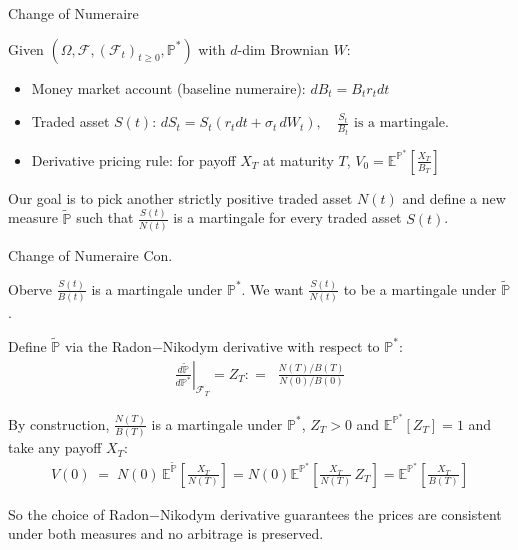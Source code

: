 \documentclass{beamer}
\begin{document}
\begin{frame}{Change of Numeraire}
    \par Given $(\Omega, \mathcal{F}, (\mathcal{F}_t)_{t \geq 0}, \mathbb{P}^*)$ with $d$-dim Brownian $W$:
    \vspace{1em}
    \begin{itemize}
        \item Money market account (baseline numeraire): $ dB_t =  B_t r_t dt$
        \item Traded asset $S(t)$: $dS_t = S_t(r_t dt + \sigma_t\, dW_t),
    \quad \tfrac{S_t}{B_t} \text{ is a martingale.}$
        \item Derivative pricing rule: for payoff $X_T$ at maturity $T$, $V_0 = \mathbb{E}^{\mathbb{P}^*}\left[\frac{X_T}{B_T}\right]$
    \end{itemize}
    \vspace{1em}
    \par Our goal is to pick another strictly positive traded asset $N(t)$ and
  define a new measure $\tilde{\mathbb{P}}$ such that $\frac{S(t)}{N(t)}$ is a martingale for every traded asset $S(t)$.
\end{frame}
\begin{frame}{Change of Numeraire Con.}

    {\footnotesize \footnotesize
    \par Oberve $\displaystyle \frac{S(t)}{B(t)}$ is a martingale under $\mathbb{P}^*$. 
    We want $\displaystyle \frac{S(t)}{N(t)}$ to be a martingale under $\tilde{\mathbb{P}}$.
    \par Define $\tilde{\mathbb{P}}$ via the Radon$-$Nikodym derivative with respect to $\mathbb{P}^*$:
    \begin{align*}
        \left.\frac{d\tilde{\mathbb{P}}}{d\mathbb{P}^*}\right|_{\mathcal{F}_T} = Z_T : = \;\;\frac{N(T)/B(T)}{N(0)/B(0)}
    \end{align*}
    \par By construction, $\frac{N(T)}{B(T)}$ is a martingale under $\mathbb{P}^*$, $Z_T >0$ and $\mathbb{E}^{\mathbb{P}^*}[Z_T]=1$ and take any payoff $X_T$:
    \begin{align*}
         V(0) \;=\; N(0)\,\mathbb{E}^{\tilde{\mathbb{P}}}\!\left[\frac{X_T}{N(T)}\right] 
         =N(0) \mathbb{E}^{\mathbb{P}^*}\!\left[\frac{X_T}{N(T)}\,Z_T\right] = \mathbb{E}^{\mathbb{P}^*}\!\left[\frac{X_T}{B(T)}\right]
    \end{align*}
    \vspace{0.5em}
    \par So the choice of Radon$-$Nikodym derivative guarantees the prices are consistent under both measures and no arbitrage is preserved.
    }
    
\end{frame}
\end{document}
